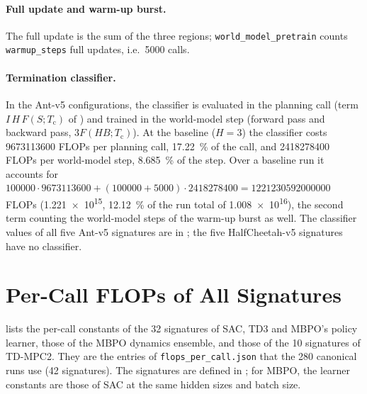 \paragraph{Full update and warm-up burst.} The full update is the sum of the three regions; \texttt{world\_\allowbreak model\_\allowbreak pretrain} counts \texttt{warmup\_\allowbreak steps} full updates, i.e.\ \num{5000} calls.

\paragraph{Termination classifier.} In the Ant-v5 configurations, the classifier is evaluated in the planning call (term $I\,H\,F(S;T_\mathrm{c})$ of ) and trained in the world-model step (forward pass and backward pass, $3F(HB;T_\mathrm{c})$).
At the baseline ($H=3$) the classifier costs \num{9673113600} FLOPs per planning call, \SI{17.22}{\percent} of the call, and \num{2418278400} FLOPs per world-model step, \SI{8.685}{\percent} of the step.
Over a baseline run it accounts for $\num{100000}\cdot\num{9673113600}+(\num{100000}+\num{5000})\cdot\num{2418278400}=\num{1221230592000000}$ FLOPs (\num{1.221e15}, \SI{12.12}{\percent} of the run total of \num{1.008e16}), the second term counting the world-model steps of the warm-up burst as well.
The classifier values of all five Ant-v5 signatures are in ; the five HalfCheetah-v5 signatures have no classifier.

\section{Per-Call FLOPs of All Signatures}\label{sec:app-flop-table}

 lists the per-call constants of the \num{32} signatures of SAC, TD3 and MBPO's policy learner,  those of the MBPO dynamics ensemble, and  those of the \num{10} signatures of TD-MPC2.
They are the entries of \texttt{flops\_\allowbreak per\_\allowbreak call.json} that the \num{280} canonical runs use (\num{42} signatures).
The signatures are defined in ; for MBPO, the learner constants are those of SAC at the same hidden sizes and batch size.

